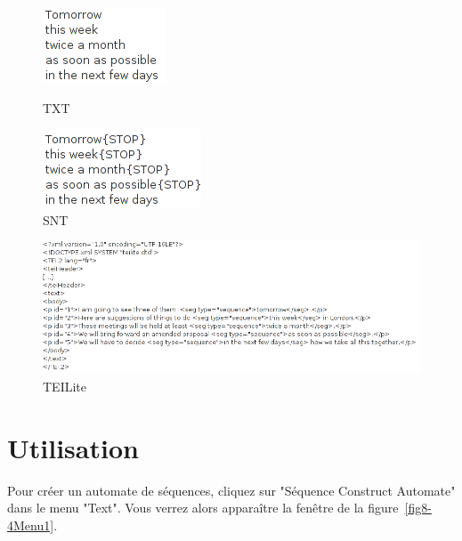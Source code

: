 \begin{figure}[!ht]
	\begin{minipage}[h!]{0.5\linewidth}
		\centering
		\includegraphics[scale=0.6]{resources/img/fig8-1tomorrow.png}	
		\caption{TXT\label{fig8-1CorpusTxt}}
		\label{fig7-TXT}
	\end{minipage}
	\hspace{0.1cm}
	\begin{minipage}[h!]{0.5\linewidth}
		\centering
		\includegraphics[scale=0.6]{resources/img/fig8-2tomorrowSNT.png}
		\caption{SNT\label{fig8-2CorpusSNT}}
	\end{minipage}
	\hspace{0.1cm}
\end{figure}
\begin{figure}[!ht]
	\begin{minipage}[h!]{\linewidth}
		\centering
			\includegraphics[width=14cm]{resources/img/fig8-3tomorrowTEI.png}
			\caption{TEILite\label{fig8-3CorpusTEI}}
	\end{minipage}
\end{figure}


\section{Utilisation}
Pour créer un automate de séquences, cliquez sur "Séquence Construct Automate" dans le menu "Text".
Vous verrez alors apparaître la fenêtre de la figure~\ref{fig8-4Menu1}.

